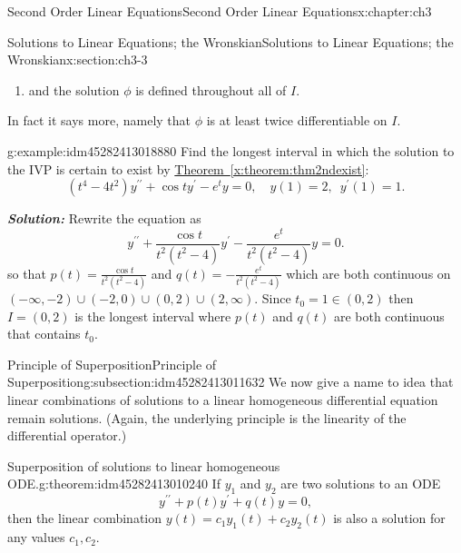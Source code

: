 \documentclass[oneside,10pt,]{book}
\newcommand{\alert}[1]{\textbf{\textit{#1}}}
\numberwithin{equation}{section}
\numberwithin{equation}{section}
\begin{document}
\begin{chapterptx}{Second Order Linear Equations}{}{Second Order Linear Equations}{}{}{x:chapter:ch3}
\begin{sectionptx}{Solutions to Linear Equations; the Wronskian}{}{Solutions to Linear Equations; the Wronskian}{}{}{x:section:ch3-3}
\begin{introduction}{}
\begin{enumerate}
\item{}and the solution \(\phi\) is defined throughout all of \(I\).%
\end{enumerate}
In fact it says more, namely that \(\phi\) is at least twice differentiable on \(I\).%
\begin{example}{}{g:example:idm45282413018880}%
Find the longest interval in which the solution to the IVP is certain to exist by \hyperref[x:theorem:thm2ndexist]{Theorem~\ref{x:theorem:thm2ndexist}}:%
\begin{equation*}
\left(t^{4}-4t^{2}\right)y^{\prime\prime}+\cos ty^{\prime}-e^{t}y=0,\,\,\,\,\,\,y(1)=2,\,\,\,y^{\prime}(1)=1.
\end{equation*}
%
\par
\alert{Solution:} Rewrite the equation as%
\begin{equation*}
y^{\prime\prime}+\frac{\cos t}{t^{2}\left(t^{2}-4\right)}y^{\prime}-\frac{e^{t}}{t^{2}\left(t^{2}-4\right)}y=0.
\end{equation*}
so that \(p(t)=\frac{\cos t}{t^{2}\left(t^{2}-4\right)}\) and \(q(t)=-\frac{e^{t}}{t^{2}\left(t^{2}-4\right)}\) which are both continuous on \(\left(-\infty,-2\right)\cup\left(-2,0\right)\cup\left(0,2\right)\cup\left(2,\infty\right)\). Since \(t_{0}=1\in\left(0,2\right)\) then \(I=\left(0,2\right)\) is the longest interval where \(p(t)\) and \(q(t)\) are both continuous that contains \(t_{0}\).%
\end{example}
\end{introduction}%
%
%
\typeout{************************************************}
\typeout{************************************************}
%
\begin{subsectionptx}{Principle of Superposition}{}{Principle of Superposition}{}{}{g:subsection:idm45282413011632}
We now give a name to idea that linear combinations of solutions to a linear homogeneous differential equation remain solutions. (Again, the underlying principle is the linearity of the differential operator.)%
\begin{theorem}{Superposition of solutions to linear homogeneous ODE.}{}{g:theorem:idm45282413010240}%
If \(y_{1}\) and \(y_{2}\) are two solutions to an ODE%
\begin{equation*}
y^{\prime\prime}+p(t)y^{\prime}+q(t)y=0,
\end{equation*}
then the linear combination \(y(t)=c_{1}y_{1}(t)+c_{2}y_{2}(t)\) is also a solution for any values \(c_{1},c_{2}\).%
\end{theorem}

\end{subsectionptx}
\end{sectionptx}
\end{chapterptx}
\end{document}
